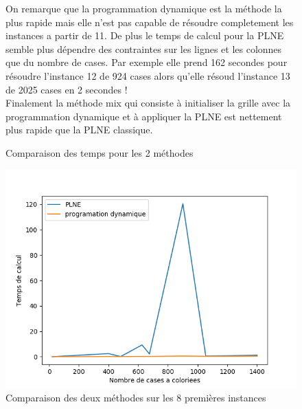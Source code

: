 \documentclass[a4paper]{memoir}
\begin{document}
\begin{figure}[h]
\begin{center}
\caption{Comparaison des temps pour les 2 méthodes}
  \end{center}
  On remarque que la programmation dynamique est la méthode la plus rapide mais elle n'est pas capable de résoudre completement les instances a partir de 11. De plus le temps de calcul pour la PLNE semble plus dépendre des contraintes sur les lignes et les colonnes que du nombre de cases. Par exemple elle prend 162 secondes pour résoudre l'instance 12 de 924 cases alors qu'elle résoud l'instance 13 de 2025 cases en 2 secondes ! \\
  Finalement la méthode mix qui consiste à initialiser la grille avec la programmation dynamique et à appliquer la PLNE est nettement plus rapide que la PLNE classique.
\end{figure}



\begin{figure}[h]
  \centering
  \includegraphics[width=0.75\linewidth]{../images/comparaison.png}
  \caption{Comparaison des deux méthodes sur les 8 premières instances}
  \label{fig:graphes-comparaison}
\end{figure}
\end{document}
